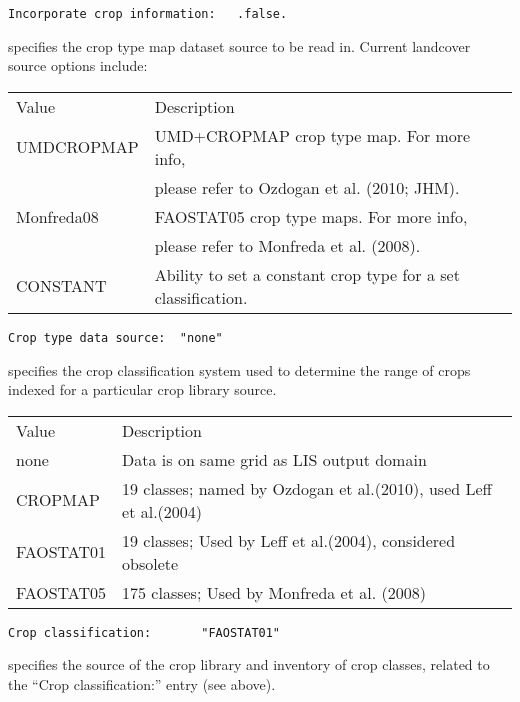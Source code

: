  \begin{Verbatim}[frame=single]
Incorporate crop information:   .false.
 \end{Verbatim}

 
  specifies the crop type map
 dataset source to be read in.
 Current landcover source options include:

 \begin{tabular}{ll}
 Value         & Description               \\
 UMDCROPMAP    & UMD+CROPMAP crop type map.  For more info,  \\
               &   please refer to Ozdogan et al. (2010; JHM).  \\
 Monfreda08    & FAOSTAT05 crop type maps.  For more info,  \\
               &   please refer to Monfreda et al. (2008).  \\
 CONSTANT      & Ability to set a constant crop type for a set classification. \\
 \end{tabular}
 

 \begin{Verbatim}[frame=single]
Crop type data source:  "none" 
 \end{Verbatim}

 
  specifies the crop classification
 system used to determine the range of crops indexed for a particular
 crop library source.

 \begin{tabular}{ll}
 Value     & Description                                          \\
 none      &  Data is on same grid as LIS output domain           \\
 CROPMAP   &   19 classes; named by Ozdogan et al.(2010), used Leff et al.(2004) \\
 FAOSTAT01 &   19 classes; Used by Leff et al.(2004), considered obsolete \\
 FAOSTAT05 &  175 classes; Used by Monfreda et al. (2008) \\
 \end{tabular}
 

 \begin{Verbatim}[frame=single]
Crop classification:       "FAOSTAT01"  
 \end{Verbatim}

  specifies the source of the
 crop library and inventory of crop classes, related to the 
 ``Crop classification:'' entry (see above).


